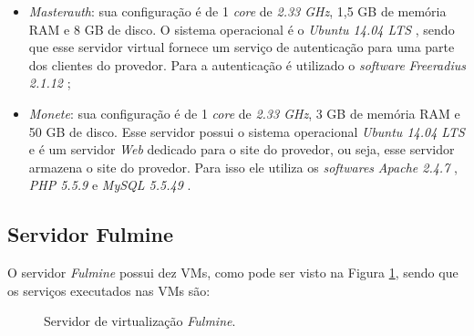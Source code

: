 \begin{itemize}
 \item \textit{Masterauth}: sua configuração é de 1 \textit{core} de \textit{2.33 GHz}, 1,5 GB de memória \ac{RAM} e 8 GB de disco. 
 O sistema operacional é o \textit{Ubuntu 14.04 \ac{LTS}} \cite{ubuntu}, sendo que esse servidor virtual fornece um serviço de autenticação 
  \cite{javvin2005} para uma parte dos clientes do provedor. Para a autenticação é utilizado o \textit{software} 
 \textit{Freeradius 2.1.12} \cite{freeradius};
 
 \item \textit{Monete}: sua configuração é de 1 \textit{core} de \textit{2.33 GHz}, 3 GB de memória \ac{RAM} e 50 GB de disco. 
 Esse servidor possui o sistema operacional \textit{Ubuntu 14.04 \ac{LTS}} \cite{ubuntu} e é um servidor \textit{Web} dedicado para o site do 
 provedor, ou seja, esse servidor armazena o site do provedor. Para isso ele utiliza os \textit{softwares} 
 \textit{Apache 2.4.7} \cite{apache}, \textit{\ac{PHP} 5.5.9} \cite{php} e \textit{MySQL 5.5.49} \cite{mysql}.
\end{itemize}

\subsection{Servidor Fulmine}
\label{section:serv_fulmine}

O servidor \textit{Fulmine} possui dez \acp{VM}, como pode ser visto na Figura \ref{fig:servidor_fulmine}, sendo que os serviços executados nas 
\acp{VM} são:

\begin{figure}[h!]
 \centering
 \caption{Servidor de virtualização \textit{Fulmine}.}
 \label{fig:servidor_fulmine}
\end{figure}

